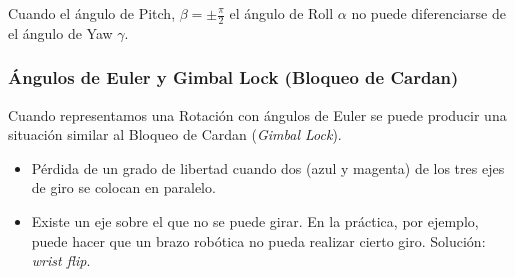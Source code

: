 \begin{frame}
    Cuando el ángulo de Pitch, $\beta = \pm \frac{\pi}{2}$ el ángulo de Roll $\alpha$ no puede diferenciarse de el ángulo de Yaw $\gamma$.
    
\end{frame}


\begin{frame}
    \frametitle{Ángulos de Euler y Gimbal Lock (Bloqueo de Cardan)}
    \scriptsize

    Cuando representamos una Rotación con ángulos de Euler se puede producir una situación similar al Bloqueo de Cardan (\emph{Gimbal Lock}).    
    
    \begin{center}
        \hspace{1em}
    \end{center}
    
    
    \begin{itemize}
        \item Pérdida de un grado de libertad cuando dos (azul y magenta) de los tres ejes de giro se colocan en paralelo.
        \item Existe un eje sobre el que no se puede girar. En la práctica, por ejemplo, puede hacer que un brazo robótica no pueda realizar cierto giro. Solución: \emph{wrist flip}.
    \end{itemize}
    

\end{frame}
